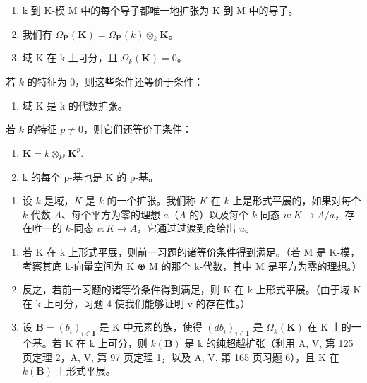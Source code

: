 \begin{enumerate}
\def\labelenumi{\alph{enumi})}
\item
  k 到 K-模 M 中的每个导子都唯一地扩张为 K 到 M 中的导子。
\item
  我们有 \(\Omega_{\mathbf{P}}(\mathbf{K}) = \Omega_{\mathbf{P}}(k)\otimes_k\mathbf{K}\)。
\item
  域 K 在 k 上可分，且 \(\Omega_{k}(\mathbf{K}) = 0\)。
\end{enumerate}

若 \(k\) 的特征为 0，则这些条件还等价于条件：

\begin{enumerate}
\def\labelenumi{\alph{enumi})}
\setcounter{enumi}{3}
\tightlist
\item
  域 K 是 k 的代数扩张。
\end{enumerate}

若 \(k\) 的特征 \(p\ne0\)，则它们还等价于条件：

\begin{enumerate}
\def\labelenumi{\alph{enumi})}
\setcounter{enumi}{4}
\item
  \(\mathbf{K} = k\otimes_{k^p}\mathbf{K}^p.\)
\item
  k 的每个 p-基也是 K 的 p-基。
\end{enumerate}

\begin{enumerate}
\def\labelenumi{\arabic{enumi})}
\setcounter{enumi}{7}
\tightlist
\item
  设 \(k\) 是域，\(K\) 是 \(k\) 的一个扩张。我们称 \(K\) 在 \(k\) 上是形式平展的，如果对每个 \(k\)-代数 \(A\)、每个平方为零的理想 \(a\)（\(A\) 的）以及每个 \(k\)-同态 \(u:K\to A/a\)，存在唯一的 \(k\)-同态 \(v:K\to A\)，它通过过渡到商给出 \(u\)。
\end{enumerate}

\begin{enumerate}
\def\labelenumi{\alph{enumi})}
\item
  若 K 在 k 上形式平展，则前一习题的诸等价条件得到满足。（若 M 是 K-模，考察其底 k-向量空间为 K ⊕ M 的那个 k-代数，其中 M 是平方为零的理想。）
\item
  反之，若前一习题的诸等价条件得到满足，则 K 在 k 上形式平展。（由于域 K 在 k 上可分，习题 4 使我们能够证明 v 的存在性。）
\item
  设 \(\mathbf{B} = (b_{i})_{i\in\mathbf{I}}\) 是 K 中元素的族，使得 \((db_{i})_{i\in\mathbf{I}}\) 是 \(\Omega_{k}(\mathbf{K})\) 在 K 上的一个基。若 K 在 k 上可分，则 \(k(\mathbf{B})\) 是 k 的纯超越扩张（利用 A, V, 第 125 页定理 2，A, V, 第 97 页定理 1，以及 A, V, 第 165 页习题 6），且 K 在 \(k(\mathbf{B})\) 上形式平展。
\end{enumerate}

